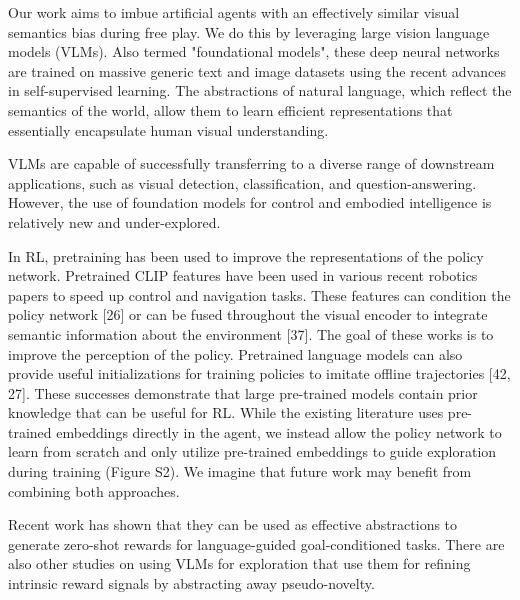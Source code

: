 
Our work aims to imbue artificial agents with an effectively similar visual semantics bias during free play.
We do this by leveraging large vision language models (VLMs).
Also termed "foundational models", these deep neural networks are trained on massive generic text and image datasets using the recent advances in self-supervised learning. 
The abstractions of natural language, which reflect the semantics of the world, allow them to learn efficient representations that essentially encapsulate human visual understanding.

VLMs are capable of successfully transferring to a diverse range of downstream applications, such as visual detection, classification, and question-answering.
However, the use of foundation models for control and embodied intelligence is relatively new and under-explored.

In RL, pretraining has been used to improve the representations of the policy network. 
Pretrained CLIP features have been used in various recent robotics papers to speed up control and navigation tasks.
These features can condition the policy network [26] or can be fused throughout the visual encoder to integrate semantic information about the environment [37]. 
The goal of these works is to improve the perception of the policy.
Pretrained language models can also provide useful initializations for training policies to imitate offline trajectories [42, 27].
These successes demonstrate that large pre-trained models contain prior knowledge that can be useful for RL. While the existing literature uses pre-trained embeddings directly in the agent, we instead allow the policy network to learn from scratch and only utilize pre-trained embeddings to guide exploration during training (Figure S2).
We imagine that future work may benefit from combining both approaches.

Recent work \citep{zest,negprompt,vlmrm,lamp} has shown that they can be used as effective abstractions to generate zero-shot rewards for language-guided goal-conditioned tasks.
There are also other studies on using VLMs for exploration \citep{vlmlang,vlmdistill} that use them for refining intrinsic reward signals by abstracting away pseudo-novelty. 

